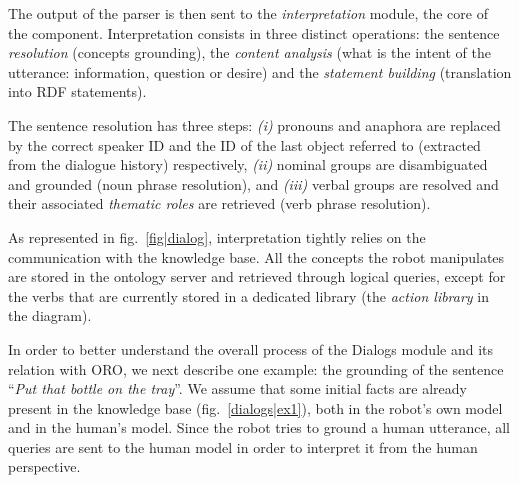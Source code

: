 \documentclass{svmult}
\begin{document}
The output of the parser is then sent to the \emph{interpretation} module, the
core of the component.  Interpretation consists in three distinct operations:
the sentence \emph{resolution} (concepts grounding), the \emph{content
analysis} (what is the intent of the utterance: information, question or
desire) and the \emph{statement building} (translation into RDF statements).

The sentence resolution has three steps: {\it(i)} pronouns and anaphora are
replaced by the correct speaker ID and the ID of the last object referred to
(extracted from the dialogue history) respectively, {\it(ii)} nominal groups are
disambiguated and grounded (noun phrase resolution), and {\it(iii)}
verbal groups are resolved and their associated \emph{thematic roles} are
retrieved (verb phrase resolution).

As represented in fig.~\ref{fig|dialog}, interpretation tightly relies on the
communication with the knowledge base. All the concepts the robot manipulates
are stored in the ontology server and retrieved through logical
queries, except for the verbs that are currently stored in a dedicated library
(the \emph{action library} in the diagram).

In order to better understand the overall process of the {\sc Dialogs} module 
and its relation with ORO, we next describe one example: the grounding of the
sentence ``\emph{Put that bottle on the tray}''. We assume that some initial
facts are already present in the knowledge base (fig.~\ref{dialogs|ex1}), both in the
robot's own model and in the human's model.  Since the robot tries to ground a
human utterance, all queries are sent to the human model in order to interpret
it from the human perspective. 
\end{document}
